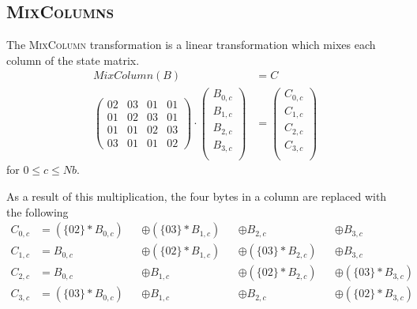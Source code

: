 \subsection{\textsc{MixColumns}}

The \textsc{MixColumn} transformation is a linear transformation which mixes each column of the state matrix. 
\begin{align}
    MixColumn(B) &= C\\
    \begin{pmatrix}
        02 & 03 & 01 & 01\\
        01 & 02 & 03 & 01\\
        01 & 01 & 02 & 03\\
        03 & 01 & 01 & 02
    \end{pmatrix}
    \cdot
    \begin{pmatrix}
        B_{0,c} \\
        B_{1,c} \\
        B_{2,c} \\
        B_{3,c} \\
    \end{pmatrix}
    &=
    \begin{pmatrix}
        C_{0,c} \\
        C_{1,c} \\
        C_{2,c} \\
        C_{3,c} \\
    \end{pmatrix}
\end{align}
for $0 \leq c \leq Nb$.

As a result of this multiplication, the four bytes in a column are replaced with the following
\begin{align}
    C_{0,c} & = (\{02\} * B_{0,c}) &&\oplus (\{03\} * B_{1,c}) &&\oplus B_{2,c} &&\oplus B_{3,c}\\
    C_{1,c} & = B_{0,c} &&\oplus (\{02\} * B_{1,c}) &&\oplus (\{03\} * B_{2,c}) &&\oplus B_{3,c}\\
    C_{2,c} & = B_{0,c}  &&\oplus B_{1,c} &&\oplus (\{02\} * B_{2,c}) &&\oplus (\{03\} * B_{3,c})\\
    C_{3,c} & = (\{03\} * B_{0,c}) &&\oplus B_{1,c} &&\oplus B_{2,c} &&\oplus (\{02\} * B_{3,c})
\end{align}
